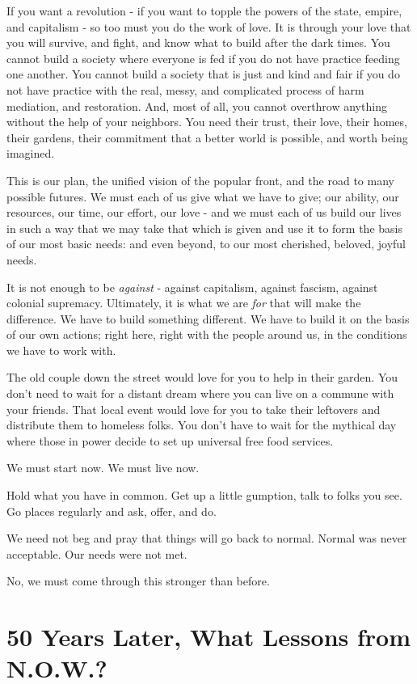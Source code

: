 \documentclass[
]{book}
\begin{document}
If you want a revolution - if you want to topple the powers of the state, empire, and capitalism - so too must you do the work of love. It is through your love that you will survive, and fight, and know what to build after the dark times. You cannot build a society where everyone is fed if you do not have practice feeding one another. You cannot build a society that is just and kind and fair if you do not have practice with the real, messy, and complicated process of harm mediation, and restoration. And, most of all, you cannot overthrow anything without the help of your neighbors. You need their trust, their love, their homes, their gardens, their commitment that a better world is possible, and worth being imagined.

This is our plan, the unified vision of the popular front, and the road to many possible futures. We must each of us give what we have to give; our ability, our resources, our time, our effort, our love - and we must each of us build our lives in such a way that we may take that which is given and use it to form the basis of our most basic needs: and even beyond, to our most cherished, beloved, joyful needs.

It is not enough to be \emph{against} - against capitalism, against fascism, against colonial supremacy. Ultimately, it is what we are \emph{for} that will make the difference. We have to build something different. We have to build it on the basis of our own actions; right here, right with the people around us, in the conditions we have to work with.

The old couple down the street would love for you to help in their garden. You don't need to wait for a distant dream where you can live on a commune with your friends. That local event would love for you to take their leftovers and distribute them to homeless folks. You don't have to wait for the mythical day where those in power decide to set up universal free food services.

We must start now. We must live now.

Hold what you have in common. Get up a little gumption, talk to folks you see. Go places regularly and ask, offer, and do.

We need not beg and pray that things will go back to normal. Normal was never acceptable. Our needs were not met.

No, we must come through this stronger than before.

\section*{50 Years Later, What Lessons from N.O.W.?}\label{years-later-what-lessons-from-n.o.w.}
\end{document}
